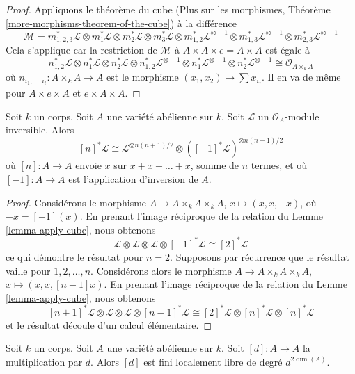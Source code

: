 \begin{proof}
Appliquons le théorème du cube
(Plus sur les morphismes, Théorème \ref{more-morphisms-theorem-of-the-cube})
à la différence
$$
\mathcal{M} =
m_{1, 2, 3}^*\mathcal{L} \otimes
m_1^*\mathcal{L} \otimes
m_2^*\mathcal{L} \otimes
m_3^*\mathcal{L} \otimes
m_{1, 2}^*\mathcal{L}^{\otimes -1} \otimes
m_{1, 3}^*\mathcal{L}^{\otimes -1} \otimes
m_{2, 3}^*\mathcal{L}^{\otimes -1}
$$
Cela s'applique car la restriction de $\mathcal{M}$
à $A \times A \times e = A \times A$ est égale à
$$
n_{1, 2}^*\mathcal{L} \otimes
n_1^*\mathcal{L} \otimes
n_2^*\mathcal{L} \otimes
n_{1, 2}^*\mathcal{L}^{\otimes -1} \otimes
n_1^*\mathcal{L}^{\otimes -1} \otimes
n_2^*\mathcal{L}^{\otimes -1} \cong \mathcal{O}_{A \times_k A}
$$
où $n_{i_1, \ldots, i_t} : A \times_k A \to A$
est le morphisme $(x_1, x_2) \mapsto \sum x_{i_j}$.
Il en va de même pour $A \times e \times A$ et $e \times A \times A$.
\end{proof}

\begin{lemma}
\label{lemma-pullbacks-by-n}
Soit $k$ un corps. Soit $A$ une variété abélienne sur $k$.
Soit $\mathcal{L}$ un $\mathcal{O}_A$-module inversible.
Alors
$$
[n]^*\mathcal{L} \cong
\mathcal{L}^{\otimes n(n + 1)/2} \otimes
([-1]^*\mathcal{L})^{\otimes n(n - 1)/2}
$$
où $[n] : A \to A$ envoie $x$ sur $x + x + \ldots + x$, somme de $n$ termes,
et où $[-1] : A \to A$ est l'application d'inversion de $A$.
\end{lemma}

\begin{proof}
Considérons le morphisme $A \to A \times_k A \times_k A$,
$x \mapsto (x, x, -x)$, où $-x = [-1](x)$. En prenant l'image réciproque
de la relation du Lemme \ref{lemma-apply-cube}, nous obtenons
$$
\mathcal{L} \otimes
\mathcal{L} \otimes
\mathcal{L} \otimes
[-1]^*\mathcal{L} \cong
[2]^*\mathcal{L}
$$
ce qui démontre le résultat pour $n = 2$. Supposons par récurrence que le résultat vaille
pour $1, 2, \ldots, n$. Considérons alors le morphisme
$A \to A \times_k A \times_k A$, $x \mapsto (x, x, [n - 1]x)$.
En prenant l'image réciproque
de la relation du Lemme \ref{lemma-apply-cube}, nous obtenons
$$
[n + 1]^*\mathcal{L} \otimes
\mathcal{L} \otimes
\mathcal{L} \otimes
[n - 1]^*\mathcal{L} \cong
[2]^*\mathcal{L} \otimes
[n]^*\mathcal{L} \otimes
[n]^*\mathcal{L}
$$
et le résultat découle d'un calcul élémentaire.
\end{proof}

\begin{lemma}
\label{lemma-degree-multiplication-by-d}
Soit $k$ un corps. Soit $A$ une variété abélienne sur $k$.
Soit $[d] : A \to A$ la multiplication par $d$.
Alors $[d]$ est fini localement libre de degré $d^{2\dim(A)}$.
\end{lemma}


